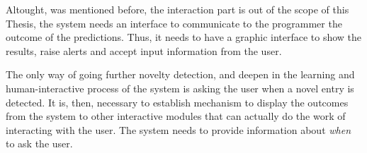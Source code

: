 Altought, was mentioned before, the interaction part is out of the scope of this Thesis, the system needs an interface to communicate to the programmer the outcome of the predictions. Thus, it needs to have a graphic interface to show the results, raise alerts and accept input information from the user.

The only way of going further novelty detection, and deepen in the learning and human-interactive process of the system is asking the user when a novel entry is detected. It is, then, necessary to establish mechanism to display the outcomes from the system to other interactive modules that can actually do the work of interacting with the user. The system needs to provide information about \emph{when} to ask the user.

\begin{flushright}

\end{flushright}
